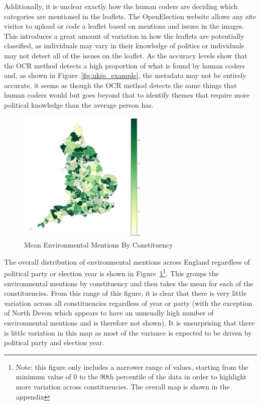 \documentclass[12pt,letterpaper]{article}
\begin{document}
Additionally, it is unclear exactly how the human coders are deciding which categories are mentioned in the leaflets. The OpenElection website allows any site visitor to upload or code a leaflet based on mentions and issues in the images. This introduces a great amount of variation in how the leaflets are potentially classified, as individuals may vary in their knowledge of politics or individuals may not detect all of the issues on the leaflet. As the accuracy levels show that the OCR method detects a high proportion of what is found by human coders and, as shown in Figure~\ref{fig:ukip_example}, the metadata may not be entirely accurate, it seems as though the OCR method detects the same things that human coders would but goes beyond that to identify themes that require more political knowledge than the average person has.



\begin{figure}
	\centering
	\includegraphics[width=0.55\textwidth]{overall_env_mentions_new.png}
	\caption{Mean Environmental Mentions By Constituency}
	\label{fig:meanenvbycon}
\end{figure}




The overall distribution of environmental mentions across England regardless of political party or election year is shown in Figure~\ref{fig:meanenvbycon}\footnote{Note: this figure only includes a narrower range of values, starting from the minimum value of 0 to the 90th percentile of the data in order to highlight more variation across constituencies. The overall map is shown in the appendix}. This groups the environmental mentions by constituency and then takes the mean for each of the constituencies. From this range of this figure, it is clear that there is very little variation across all constituencies regardless of year or party (with the exception of North Devon which appears to have an unusually high number of environmental mentions and is therefore not shown). It is unsurprising that there is little variation in this map as most of the variance is expected to be driven by political party and election year. 
\end{document}
